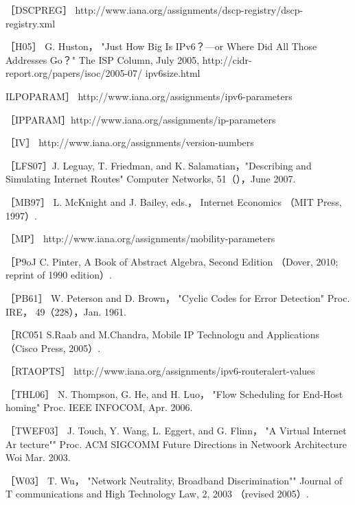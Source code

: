 ［DSCPREG］ http://www.iana.org/assignments/dscp-registry/dscp-registry.xml

［H05］ G. Huston， "Just How Big Is IPv6？—or Where Did All Those Addresses
Go？" The ISP Column, July 2005, http://cidr-report.org/papers/isoc/2005-07/
ipv6size.html

ILPOPARAM］ http://www.iana.org/assignments/ipv6-parameters

［IPPARAM］http://www.iana.org/assignments/ip-parameters

［IV］ http://www.iana.org/assignments/version-numbers

［LFS07］J. Leguay, T. Friedman, and K. Salamatian，"Describing and Simulating
Internet Routes" Computer Networks, 51（），June 2007.

［MB97］ L. McKnight and J. Bailey, eds.， Internet Economics （MIT Press, 1997）.

［MP］ http://www.iana.org/assignments/mobility-parameters

［P9oJ C. Pinter, A Book of Abstract Algebra, Second Edition （Dover, 2010; reprint of
1990 edition）.

［PB61］ W. Peterson and D. Brown， "Cyclic Codes for Error Detection" Proc. IRE，
49（228），Jan. 1961.

［RC051 S.Raab and M.Chandra, Mobile IP Technologu and Applications （Cisco
Press, 2005）.

［RTAOPTS］ http://www.iana.org/assignments/ipv6-routeralert-values

［THL06］ N. Thompson, G. He, and H. Luo， "Flow Scheduling for End-Host
homing" Proc. IEEE INFOCOM, Apr. 2006.

［TWEF03］ J. Touch, Y. Wang, L. Eggert, and G. Flinn， "A Virtual Internet Ar
tecture"" Proc. ACM SIGCOMM Future Directions in Netwoork Architecture Woi
Mar. 2003.

［W03］ T. Wu， "Network Neutrality, Broadband Discrimination"" Journal of T
communications and High Technology Law, 2, 2003 （revised 2005）.